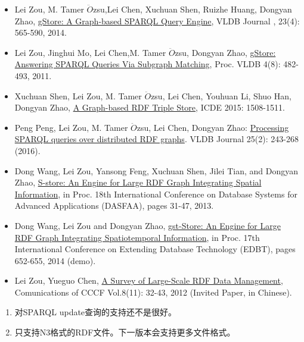 \documentclass[titlepage, a4paper, 12pt]{article}
\makeatletter
\newcommand{\xiaosihao}{\fontsize{12pt}{\baselineskip}\selectfont}
\renewcommand\subsection{\@startsection{subsection}{1}{\z@}%
{-1.25ex \@plus -.5ex \@minus -.2ex}%
{.4ex \@plus .1ex}%
{\normalfont\xiaosihao\CJKfamily{hei}}}
\makeatother
\begin{document}
\begin{itemize}
	\item
	Lei Zou, M. Tamer $\ddot{O}$zsu,Lei Chen, Xuchuan Shen, Ruizhe Huang, Dongyan Zhao, \href{http://www.icst.pku.edu.cn/intro/leizou/projects/papers/gStoreVLDBJ.pdf}{gStore: A Graph-based SPARQL Query Engine}, VLDB Journal , 23(4): 565-590, 2014.
	\item
	Lei Zou, Jinghui Mo, Lei Chen,M. Tamer $\ddot{O}$zsu, Dongyan Zhao, \href{http://www.icst.pku.edu.cn/intro/leizou/projects/papers/p482-zou.pdf}{gStore: Answering SPARQL Queries Via Subgraph Matching}, Proc. VLDB 4(8): 482-493, 2011.
	\item
	Xuchuan Shen, Lei Zou, M. Tamer $\ddot{O}$zsu, Lei Chen, Youhuan Li, Shuo Han, Dongyan Zhao, \href{http://www.icst.pku.edu.cn/intro/leizou/projects/papers/demo.pdf}{A Graph-based RDF Triple Store}, ICDE 2015: 1508-1511.
	\item
	Peng Peng, Lei Zou, M. Tamer $\ddot{O}$zsu, Lei Chen, Dongyan Zhao: \href{http://arxiv.org/pdf/1411.6763v4.pdf}{Processing SPARQL queries over distributed RDF graphs}. VLDB Journal 25(2): 243-268 (2016).
	\item
	Dong Wang, Lei Zou, Yansong Feng, Xuchuan Shen, Jilei Tian, and Dongyan Zhao,   \href{http://www.icst.pku.edu.cn/intro/leizou/projects/papers/Store.pdf}{S-store: An Engine for Large RDF Graph Integrating Spatial Information}, in Proc. 18th International Conference on Database Systems for Advanced   Applications (DASFAA), pages 31-47, 2013.
	\item
	Dong Wang, Lei Zou and Dongyan Zhao,   \href{http://www.icst.pku.edu.cn/intro/leizou/projects/papers/edbtdemo2014.pdf}{gst-Store: An Engine for Large RDF Graph Integrating Spatiotemporal Information}, in Proc. 17th International Conference on Extending Database
	Technology (EDBT), pages 652-655, 2014 (demo).
	\item
	Lei Zou, Yueguo Chen, \href{http://www.icst.pku.edu.cn/intro/leizou/documentation/pdf/2012CCCF.pdf}{A Survey of Large-Scale RDF Data Management}, Comunications of CCCF Vol.8(11): 32-43, 2012 (Invited Paper, in Chinese).
\end{itemize}

\clearpage

\hyperdef{}{chapter10}{\subsection{第10章：限制}\label{chapter10}}

\begin{enumerate}
	\item
	对SPARQL update查询的支持还不是很好。
	\item
	只支持N3格式的RDF文件。下一版本会支持更多文件格式。
\end{enumerate}
\end{document}
